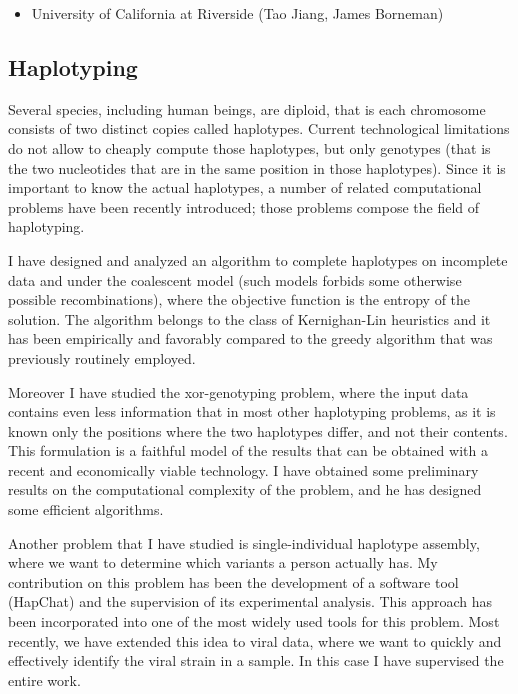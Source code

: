\documentclass[11pt,a4paper,roman]{moderncv}
\begin{document}
\begin{itemize}
	\item
	      University of California at Riverside (Tao Jiang, James Borneman)
\end{itemize}

\subsection{Haplotyping}\label{haplotyping}

Several species, including human beings, are diploid, that is each
chromosome consists of two distinct copies called haplotypes. Current
technological limitations do not allow to cheaply compute those
haplotypes, but only genotypes (that is the two nucleotides that are in
the same position in those haplotypes). Since it is important to know
the actual haplotypes, a number of related computational problems have
been recently introduced; those problems compose the field of
haplotyping.

I have designed and analyzed an algorithm to complete haplotypes on
incomplete data and under the coalescent model (such models forbids some
otherwise possible recombinations), where the objective function is the
entropy of the solution. The algorithm belongs to the class of
Kernighan-Lin heuristics and it has been empirically and favorably
compared to the greedy algorithm that was previously routinely employed.

Moreover I have studied the xor-genotyping problem, where the input data
contains even less information that in most other haplotyping problems,
as it is known only the positions where the two haplotypes differ, and
not their contents. This formulation is a faithful model of the results
that can be obtained with a recent and economically viable technology.
I have obtained some preliminary results on the computational complexity
of the problem, and he has designed some efficient algorithms.

Another problem that I have studied is single-individual haplotype assembly, where we want to
determine which variants a person actually has.
My contribution on this problem has been the development of a software tool
(HapChat) and the supervision of its experimental analysis.
This approach has been incorporated into one of the most widely used tools for
this problem.
Most recently, we have extended this idea to viral data, where we want to
quickly and effectively identify the viral strain in a sample.
In this case I have supervised the entire work.
\end{document}
